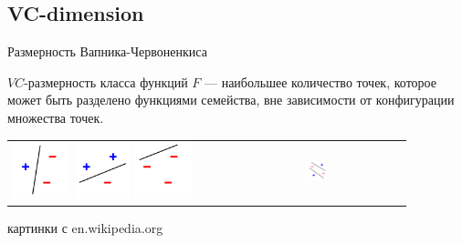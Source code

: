 \documentclass[14pt, fleqn, xcolor={dvipsnames, table}]{beamer}
\begin{document}
\subsection{VC-dimension}
\begin{frame}{Размерность Вапника-Червоненкиса}
\begin{definition}
$VC$-размерность класса функций $F$ --- наибольшее количество точек, которое может быть разделено функциями семейства, вне зависимости от конфигурации множества точек.
\end{definition}
\begin{tabular}{p{}p{}}
\colorbox{green!10}{
\includegraphics[width=0.20\textwidth]{100px-VC1.png}\hspace{2px}
\includegraphics[width=0.20\textwidth]{100px-VC2.png}\hspace{2px}
\includegraphics[width=0.20\textwidth]{100px-VC3.png}\hspace{1px}
} & \colorbox{red!10}{
\includegraphics[width=0.20\textwidth]{100px-VC4.png}\hspace{1px}
} \\
\end{tabular}
{\footnotesize картинки с en.wikipedia.org}
\end{frame}
\end{document}
